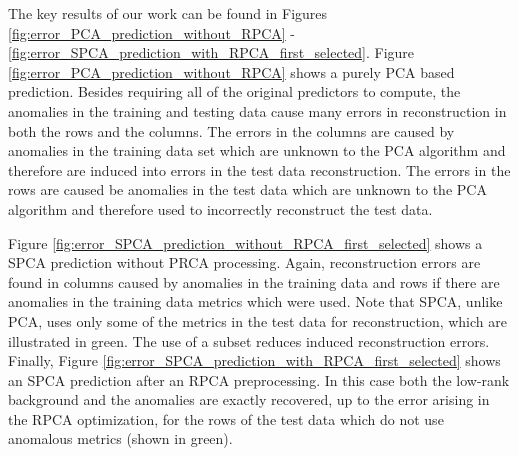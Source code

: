 \documentclass[conference]{IEEEtran}
\begin{document}
The key results of our work can be found in Figures \ref{fig:error_PCA_prediction_without_RPCA} -  
\ref{fig:error_SPCA_prediction_with_RPCA_first_selected}.
Figure \ref{fig:error_PCA_prediction_without_RPCA} shows a purely PCA based prediction.  Besides requiring all of the original predictors to compute, the anomalies in the training and testing data cause many errors in reconstruction in both the rows and the columns.  The errors in the columns are caused by anomalies in the training data set which are unknown to the PCA algorithm and therefore are induced into errors in the test data reconstruction.  The errors in the rows are caused be anomalies in the test data which are unknown to the PCA algorithm and therefore used to incorrectly reconstruct the test data.  %

Figure \ref{fig:error_SPCA_prediction_without_RPCA_first_selected} shows a SPCA prediction without PRCA processing.  Again, reconstruction errors are found in columns caused by anomalies in the training data and rows if there are anomalies in the training data metrics which were used.  Note that SPCA, unlike PCA, uses only some of the metrics in the test data for reconstruction, which are illustrated in green. The use of a subset reduces induced reconstruction errors.
Finally, Figure \ref{fig:error_SPCA_prediction_with_RPCA_first_selected} shows an SPCA prediction after an RPCA preprocessing.  In this case both the low-rank background and the anomalies are exactly recovered, up to the error arising in the RPCA optimization, for the rows of the test data which do not use anomalous metrics (shown in green).
\end{document}
